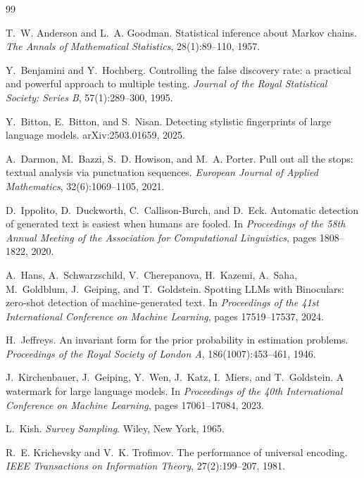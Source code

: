 \documentclass[11pt]{article}
\begin{document}
\begin{thebibliography}{99}

T.~W. Anderson and L.~A. Goodman.
\newblock Statistical inference about Markov chains.
\newblock \emph{The Annals of Mathematical Statistics}, 28(1):89--110, 1957.

Y.~Benjamini and Y.~Hochberg.
\newblock Controlling the false discovery rate: a practical and powerful
approach to multiple testing.
\newblock \emph{Journal of the Royal Statistical Society: Series B},
57(1):289--300, 1995.

Y.~Bitton, E.~Bitton, and S.~Nisan.
\newblock Detecting stylistic fingerprints of large language models.
\newblock arXiv:2503.01659, 2025.

A.~Darmon, M.~Bazzi, S.~D. Howison, and M.~A. Porter.
\newblock Pull out all the stops: textual analysis via punctuation sequences.
\newblock \emph{European Journal of Applied Mathematics}, 32(6):1069--1105,
2021.

D.~Ippolito, D.~Duckworth, C.~Callison-Burch, and D.~Eck.
\newblock Automatic detection of generated text is easiest when humans are
fooled.
\newblock In \emph{Proceedings of the 58th Annual Meeting of the Association
for Computational Linguistics}, pages 1808--1822, 2020.

A.~Hans, A.~Schwarzschild, V.~Cherepanova, H.~Kazemi, A.~Saha, M.~Goldblum,
J.~Geiping, and T.~Goldstein.
\newblock Spotting LLMs with Binoculars: zero-shot detection of
machine-generated text.
\newblock In \emph{Proceedings of the 41st International Conference on
Machine Learning}, pages 17519--17537, 2024.

H.~Jeffreys.
\newblock An invariant form for the prior probability in estimation problems.
\newblock \emph{Proceedings of the Royal Society of London A},
186(1007):453--461, 1946.

J.~Kirchenbauer, J.~Geiping, Y.~Wen, J.~Katz, I.~Miers, and T.~Goldstein.
\newblock A watermark for large language models.
\newblock In \emph{Proceedings of the 40th International Conference on Machine
Learning}, pages 17061--17084, 2023.

L.~Kish.
\newblock \emph{Survey Sampling}.
\newblock Wiley, New York, 1965.

R.~E. Krichevsky and V.~K. Trofimov.
\newblock The performance of universal encoding.
\newblock \emph{IEEE Transactions on Information Theory}, 27(2):199--207,
1981.


\end{thebibliography}
\end{document}
